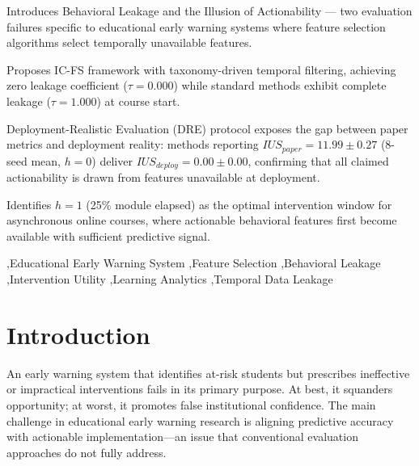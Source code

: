 \documentclass[a4paper,fleqn]{cas-sc}
\begin{document}

\begin{highlights}
\item Introduces Behavioral Leakage and the Illusion of Actionability --- two evaluation failures specific to educational early warning systems where feature selection algorithms select temporally unavailable features.
\item Proposes IC-FS framework with taxonomy-driven temporal filtering, achieving zero leakage coefficient ($\tau = 0.000$) while standard methods exhibit complete leakage ($\tau = 1.000$) at course start.
\item Deployment-Realistic Evaluation (DRE) protocol exposes the gap between paper metrics and deployment reality: methods reporting $IUS_{paper} = 11.99 \pm 0.27$ (8-seed mean, $h=0$) deliver $IUS_{deploy} = 0.00 \pm 0.00$, confirming that all  claimed actionability is drawn from features unavailable at deployment.
\item Identifies $h=1$ (25\% module elapsed) as the optimal intervention window for asynchronous online courses, where actionable behavioral features first become available with sufficient predictive signal.
\end{highlights}


\begin{keywords}
 \sep Educational Early Warning System \sep Feature Selection \sep Behavioral Leakage \sep Intervention Utility \sep Learning Analytics \sep Temporal Data Leakage
\end{keywords}

\maketitle

\section{Introduction}
\label{sec:introduction}

An early warning system that identifies at-risk students but prescribes ineffective or impractical interventions fails in its primary purpose. At best, it squanders opportunity; at worst, it promotes false institutional confidence. The main challenge in educational early warning research is aligning predictive accuracy with actionable implementation---an issue that conventional evaluation approaches do not fully address.
\end{document}
